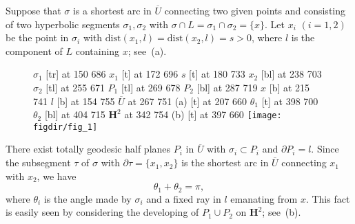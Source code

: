 \documentclass{gtart_a}
\theoremstyle{definition}
\numberwithin{equation}{section}
\begin{document}
Suppose that $\sigma$ is a shortest arc in $\overline{U}$ connecting two given points and consisting of two 
hyperbolic segments $\sigma_1,\sigma_2$ with $\sigma\cap L=\sigma_1\cap \sigma_2=\{x\}$.
Let $x_i$ $(i=1,2)$ be the point in $\sigma_i$ with $\mathrm{dist} (x_1,l)=\mathrm{dist}(x_2,l)=s>0$, where $l$ 
is the component of $L$ containing $x$; see \,(a).
\begin{figure}[ht!]
\small\hair 2pt
\pinlabel $\sigma_1$ [tr] at 150 686
\pinlabel $x_1$ [t] at 172 696
\pinlabel $s$ [t] at 180 733
\pinlabel $x_2$ [bl] at 238 703
\pinlabel $\sigma_2$ [tl] at 255 671
\pinlabel $P_1$ [tl] at 269 678
\pinlabel $P_2$ [bl] at 287 719
\pinlabel $x$ [b] at 215 741
\pinlabel $l$ [b] at 154 755
\pinlabel $\overline{U}$ at 267 751
\pinlabel (a) [t] at 207 660
\pinlabel $\theta_1$ [t] at 398 700
\pinlabel $\theta_2$ [bl] at 404 715 
\pinlabel $\mathbf{H}^2$ at 342 754
\pinlabel (b) [t] at 397 660
\endlabellist
\centering
\texttt{[image: \\figdir/fig\_1]}
\caption{}
\label{f_1}
\end{figure}
There exist totally geodesic half planes $P_i$ in $\overline U$ with $\sigma_i\subset P_i$ and $\partial P_i = l$. 
Since the subsegment $\tau$ of $\sigma$ with $\partial \tau=\{x_1,x_2\}$ is the shortest arc in $\overline U$ 
connecting $x_1$ with $x_2$, we have
\begin{equation}\label{eqn_1}
\theta_1+\theta_2=\pi,
\end{equation}
where $\theta_i$ is the angle made by $\sigma_i$ and a fixed ray in $l$ emanating from $x$.
This fact is easily seen by considering the developing of $P_1\cup P_2$ on $\mathbf{H}^2$; see \,(b).
\end{document}
